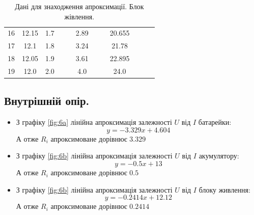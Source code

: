 \documentclass[a4paper,12pt]{article}
\begin{document}
\begin{justify}
\begin{table}[htp]
\begin{tabular}{|c|c|c|c|c|c|c|c|c|c|c|c|}
16 & 12.15 & 1.7 &                        &                          & 2.89  &                          &                         & 20.655     &                           &                        &                        \\ \cline{1-3} \cline{6-6} \cline{9-9}
17 & 12.1  & 1.8 &                        &                          & 3.24  &                          &                         & 21.78      &                           &                        &                        \\ \cline{1-3} \cline{6-6} \cline{9-9}
18 & 12.05 & 1.9 &                        &                          & 3.61  &                          &                         & 22.895     &                           &                        &                        \\ \cline{1-3} \cline{6-6} \cline{9-9}
19 & 12.0  & 2.0 &                        &                          & 4.0   &                          &                         & 24.0       &                           &                        &                        \\ \hline
\end{tabular}\caption{Дані для знаходження апроксимації. Блок жівлення.}
\label{table:approxps}
\end{table}
	\subsection{Внутрішній опір.}
	\begin{itemize}
		\item З графіку \ref{fig:6a} лінійна апроксимація залежності $U$ від $I$ батарейки: $$y=-3.329 x + 4.604$$ А отже $R_i$ апроксимоване дорівнює $3.329$
		\item З графіку \ref{fig:6b} лінійна апроксимація залежності $U$ від $I$ акумулятору: $$y=-0.5 x + 13$$  А отже $R_i$ апроксимоване дорівнює $0.5$
		\item З графіку \ref{fig:6b} лінійна апроксимація залежності $U$ від $I$ блоку живлення: $$y=-0.2414 x + 12.12$$ А отже $R_i$ апроксимоване дорівнює $0.2414$
	\end{itemize}

\end{justify}
\end{document}
